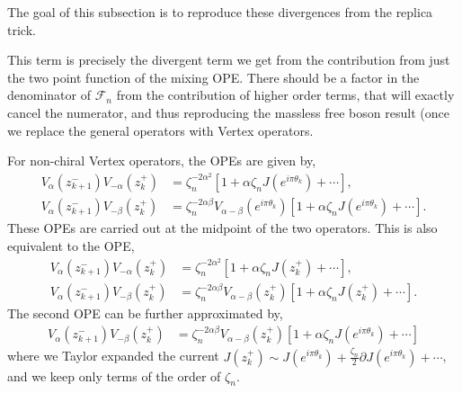 \documentclass[11pt]{article}
\newcommand{\p}{\partial}
\begin{document}
The goal of this subsection is to reproduce these divergences from the replica trick.




This term is precisely the divergent term we get from the contribution from just the two point function of the mixing OPE. There should be a factor in the denominator of $\mathcal{F}_n$ from the contribution of higher order terms, that will exactly cancel the numerator, and thus reproducing the massless free boson result (once we replace the general operators with Vertex operators. 

For non-chiral Vertex operators, the OPEs are given by,
\begin{align}
    V_\alpha(z_{k+1}^-)V_{-\alpha}(z_k^+)&= \zeta_n^{-2\alpha^2} [1 + \alpha \zeta_n J(e^{i\pi \theta_k}) + \cdots],\\
    V_\alpha(z_{k+1}^-)V_{-\beta}(z_k^+) &= \zeta_n^{-2\alpha\beta}V_{\alpha-\beta}(e^{i\pi \theta_k})\left[ 1+ \alpha \zeta_n J(e^{i\pi \theta_k}) + \cdots \right].
\end{align}
These OPEs are carried out at the midpoint of the two operators. This is also equivalent to the OPE,
\begin{align}
    V_\alpha(z_{k+1}^-)V_{-\alpha}(z_k^+) &= \zeta_n^{-2\alpha^2}[1 + \alpha \zeta_n J(z_k^+) + \cdots],\\
    V_\alpha(z_{k+1}^-)V_{-\beta}(z_k^+) &= \zeta_n^{-2\alpha\beta}V_{\alpha-\beta}(z_{k}^+)\left[ 1+ \alpha \zeta_n J(z_k^+) + \cdots \right].
\end{align}
The second OPE can be further approximated by,
\begin{align}
    V_\alpha(z_{k+1}^-)V_{-\beta}(z_k^+) &= \zeta_n^{-2\alpha\beta}V_{\alpha-\beta}(z_{k}^+)\left[ 1+ \alpha \zeta_n J(e^{i \pi \theta_k}) + \cdots \right]
\end{align}
where we Taylor expanded the current $J(z_k^+)\sim J(e^{i\pi \theta_k}) + \frac{\zeta_n}{2}\p J(e^{i\pi\theta_k}) + \cdots$, and we keep only terms of the order of $\zeta_n$.
\end{document}
